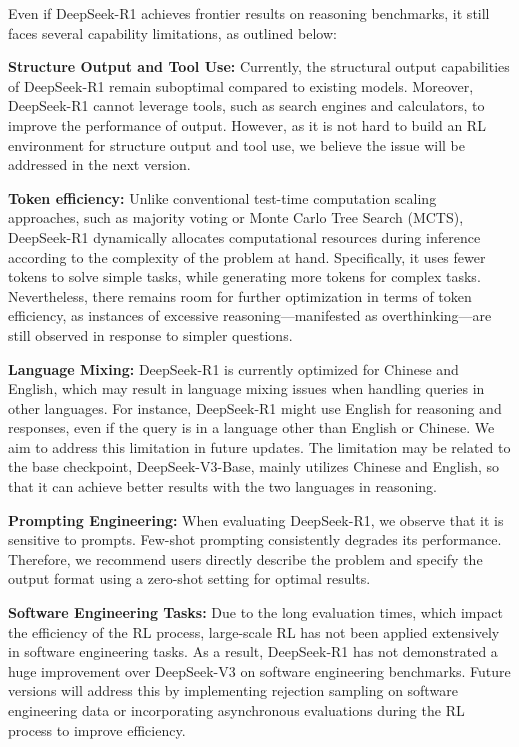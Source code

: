 \label{sec:limit}
Even if DeepSeek-R1 achieves frontier results on reasoning benchmarks, it still faces several capability limitations, as outlined below:

 \textbf{Structure Output and Tool Use:} Currently, the structural output capabilities of DeepSeek-R1 remain suboptimal compared to existing models. Moreover, DeepSeek-R1 cannot leverage tools, such as search engines and calculators, to improve the performance of output. However, as it is not hard to build an RL environment for structure output and tool use, we believe the issue will be addressed in the next version.

  \textbf{Token efficiency:} Unlike conventional test-time computation scaling approaches, such as majority voting or Monte Carlo Tree Search (MCTS), DeepSeek-R1 dynamically allocates computational resources during inference according to the complexity of the problem at hand. Specifically, it uses fewer tokens to solve simple tasks, while generating more tokens for complex tasks. Nevertheless, there remains room for further optimization in terms of token efficiency, as instances of excessive reasoning—manifested as overthinking—are still observed in response to simpler questions.

 \textbf{Language Mixing:} DeepSeek-R1 is currently optimized for Chinese and English, which may result in language mixing issues when handling queries in other languages. For instance, DeepSeek-R1 might use English for reasoning and responses, even if the query is in a language other than English or Chinese. We aim to address this limitation in future updates. The limitation may be related to the base checkpoint, DeepSeek-V3-Base, mainly utilizes Chinese and English, so that it can achieve better results with the two languages in reasoning. 

 \textbf{Prompting Engineering:} When evaluating DeepSeek-R1, we observe that it is sensitive to prompts. Few-shot prompting consistently degrades its performance. Therefore, we recommend users directly describe the problem and specify the output format using a zero-shot setting for optimal results.

 \textbf{Software Engineering Tasks:} Due to the long evaluation times, which impact the efficiency of the RL process, large-scale RL has not been applied extensively in software engineering tasks. As a result, DeepSeek-R1 has not demonstrated a huge improvement over DeepSeek-V3 on software engineering benchmarks. Future versions will address this by implementing rejection sampling on software engineering data or incorporating asynchronous evaluations during the RL process to improve efficiency.

